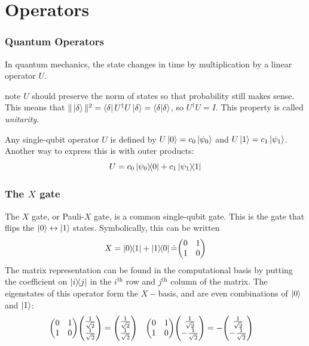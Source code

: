 \documentclass{beamer}
\begin{document}
\section{Operators}
\begin{frame}
\frametitle{Quantum Operators}
In quantum mechanics, the state changes in time by multiplication by a linear operator $U$.
\begin{block}{note}
$U$ should preserve the norm of states so that probability still makes sense. This means that $\Vert \ket{\delta}\Vert ^2 = \bra{\delta}U^\dagger U \ket{\delta} = \braket{\delta}{\delta}$, so $U^\dagger U = I$. This property is called \textit{unitarity}.
\end{block}
Any single-qubit operator $U$ is defined by $U\ket{0} = c_0\ket{\psi_0}$ and $U\ket{1} = c_1\ket{\psi_1}$. Another way to express this is with outer products:
$$
U = c_0\ketbra{\psi_0}{0}+c_1 \ketbra{\psi_1}{1}
$$
\end{frame}
\begin{frame}
\frametitle{The $X$ gate}
The $X$ gate, or Pauli-$X$ gate, is a common single-qubit gate. This is the gate that flips the $\ket{0} \leftrightarrow \ket{1}$ states. Symbolically, this can be written
$$
X = \ketbra{0}{1} + \ketbra{1}{0} \dot = \mqty(0 & 1 \\ 1 & 0)
$$
The matrix representation can be found in the computational basis by putting the coefficient on $\ketbra{i}{j}$ in the $i^\text{th}$ row and $j^\text{th}$ column of the matrix.\vspace{.5cm}
The eigenstates of this operator form the $X-$basis, and are even combinations of $\ket{0}$ and $\ket{1}$:
\begin{align*}
\mqty(0 & 1 \\ 1 & 0)\mqty(\frac{1}{\sqrt{2}} \\ \frac{1}{\sqrt{2}}) &= \mqty(\frac{1}{\sqrt{2}} \\ \frac{1}{\sqrt{2}}) & \mqty(0 & 1 \\ 1 & 0)\mqty(\frac{1}{\sqrt{2}} \\ -\frac{1}{\sqrt{2}}) &= -\mqty(\frac{1}{\sqrt{2}} \\ -\frac{1}{\sqrt{2}}) 
\end{align*}
\end{frame}
\end{document}

